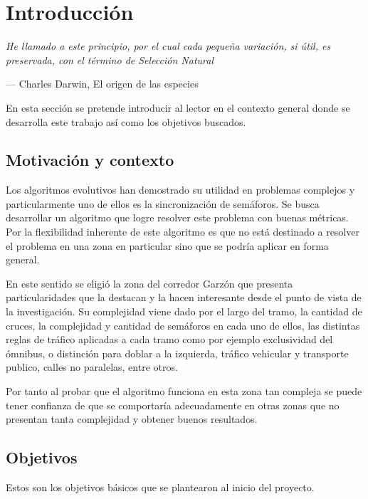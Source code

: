 \chapter{Introducción}
\epigraph{ \textit{He llamado a este principio, por el cual cada pequeña variación, si útil, es preservada, con el término de Selección Natural}}{--- Charles Darwin, El origen de las especies}

En esta sección se pretende introducir al lector en el contexto general donde se desarrolla este trabajo así como los objetivos buscados.

\section{Motivación y contexto}

Los algoritmos evolutivos han demostrado su utilidad en problemas complejos y particularmente uno de ellos es la sincronización de semáforos. Se busca desarrollar un algoritmo que logre resolver este problema con buenas métricas.
Por la flexibilidad inherente de este algoritmo es que no está destinado a resolver el problema en una zona en particular sino que se podría aplicar en forma general.

En este sentido se eligió la zona del corredor Garzón que presenta particularidades que la destacan y la hacen interesante desde el punto de vista de la investigación. Su complejidad viene dado por el largo del tramo, la cantidad de cruces, la complejidad y cantidad de semáforos en cada uno de ellos, las distintas reglas de tráfico aplicadas a cada tramo como por ejemplo exclusividad del ómnibus, o distinción para doblar a la izquierda, tráfico vehicular y transporte publico, calles no paralelas, entre otros.

Por tanto al probar que el algoritmo funciona en esta zona tan compleja se puede tener confianza de que se comportaría adecuadamente en otras zonas que no presentan tanta complejidad y obtener buenos resultados.



\newpage

\section{Objetivos}

Estos son los objetivos básicos que se plantearon al inicio del  proyecto.

